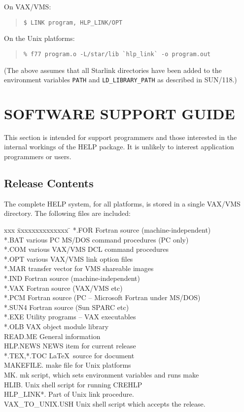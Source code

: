 On VAX/VMS:
\begin{verse}
\verb|$ LINK program, HLP_LINK/OPT|
\end{verse}

On the Unix platforms:\begin{verse}
\verb|% f77 program.o -L/star/lib `hlp_link` -o program.out|
\end{verse}
(The above assumes that all Starlink directories
have been added to the environment variables \verb|PATH| and
\verb|LD_LIBRARY_PATH| as described in SUN/118.)

\section{SOFTWARE SUPPORT GUIDE}
This section is intended for support programmers and those interested
in the internal workings of the HELP package.  It is unlikely to
interest application programmers or users.

\subsection{Release Contents}
The complete HELP system, for all platforms,
is stored in a single VAX/VMS directory.
The following files are included:
\begin{tabbing}
xxx \= xxxxxxxxxxxxxx \= \kill
\> *.FOR \> Fortran source (machine-independent) \\
\> *.BAT \> various PC MS/DOS command procedures (PC only)\\
\> *.COM \> various VAX/VMS DCL command procedures \\
\> *.OPT \> various VAX/VMS link option files \\
\> *.MAR \> transfer vector for VMS shareable images \\
\> *.IND \> Fortran source (machine-independent) \\
\> *.VAX \> Fortran source (VAX/VMS etc) \\
\> *.PCM \> Fortran source (PC -- Microsoft Fortran under MS/DOS) \\
\> *.SUN4 \> Fortran source (Sun SPARC etc) \\
\> *.EXE \> Utility programs -- VAX executables \\
\> *.OLB \> VAX object module library \\
\> READ.ME \> General information \\
\> HLP.NEWS \> NEWS item for current release \\
\> *.TEX,*.TOC \> \LaTeX\ source for document \\
\> MAKEFILE. \> make file for Unix platforms \\
\> MK. \> mk script, which sets environment variables and runs make \\
\> HLIB. \> Unix shell script for running CREHLP \\
\> HLP\_LINK*. \> Part of Unix link procedure. \\
\> VAX\_TO\_UNIX.USH \> Unix shell script which accepts the release.
\end{tabbing}

